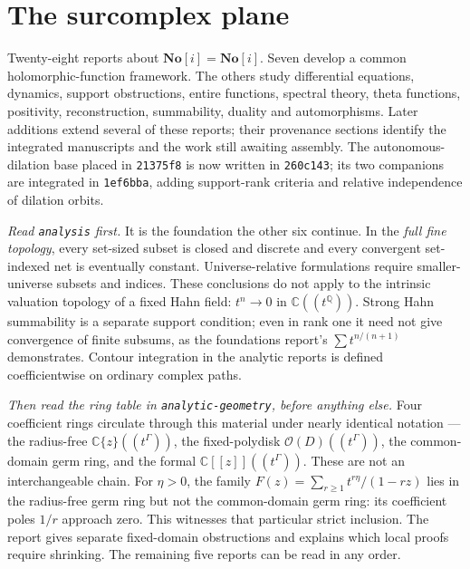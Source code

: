 \documentclass[11pt]{article}
\newcommand{\dir}[1]{\texttt{#1}}
\newcommand{\Q}{\mathbb{Q}}
\newcommand{\C}{\mathbb{C}}
\newcommand{\No}{\mathbf{No}}
\newcommand{\SC}{\mathbf{No}[i]}
\begin{document}
\section{The surcomplex plane}

Twenty-eight reports about $\SC=\No[i]$. Seven develop a common
holomorphic-function framework. The others study differential equations,
dynamics, support obstructions, entire functions, spectral theory, theta
functions, positivity, reconstruction, summability, duality and automorphisms.
Later additions extend several of these reports; their provenance sections
identify the integrated manuscripts and the work still awaiting assembly.
The autonomous-dilation base placed in \texttt{21375f8} is now written in
\texttt{260c143}; its two companions are integrated in \texttt{1ef6bba},
adding support-rank criteria and relative independence of dilation orbits.

\medskip
\noindent
\emph{Read \dir{analysis} first.}  It is the foundation the other six
continue. In the \emph{full fine topology}, every set-sized subset is closed
and discrete and every convergent set-indexed net is eventually constant.
Universe-relative formulations require smaller-universe subsets and indices.
These conclusions do not apply to the intrinsic valuation topology of a fixed
Hahn field: $t^n\to0$ in $\C((t^\Q))$. Strong Hahn summability is a separate
support condition; even in rank one it need not give convergence of finite
subsums, as the foundations report's $\sum t^{n/(n+1)}$ demonstrates.
Contour integration in the analytic reports is defined coefficientwise on
ordinary complex paths.

\medskip
\noindent
\emph{Then read the ring table in \dir{analytic-geometry}, before anything
else.}  Four coefficient rings circulate through this material under nearly
identical notation --- the radius-free $\C\{z\}((t^\Gamma))$, the
fixed-polydisk $\mathcal{O}(D)((t^\Gamma))$, the common-domain germ ring, and
the formal $\C[[z]]((t^\Gamma))$. These are not an interchangeable chain.
For $\eta>0$, the family $F(z)=\sum_{r\ge1}t^{r\eta}/(1-rz)$ lies in the
radius-free germ ring but not the common-domain germ ring: its coefficient
poles $1/r$ approach zero. This witnesses that particular strict inclusion.
The report gives separate fixed-domain obstructions and explains which local
proofs require shrinking. The remaining five reports can be read in any order.
\end{document}
